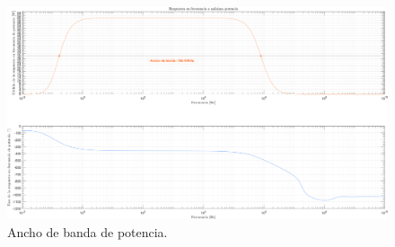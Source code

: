 \clearpage

\begin{figure}[H]
	\centering
	\includegraphics[width=0.7\paperheight, angle=90]{img/sims/Power_BW.png}
	\caption{Ancho de banda de potencia.}
	\label{fig:power_BW}
\end{figure}

\clearpage




